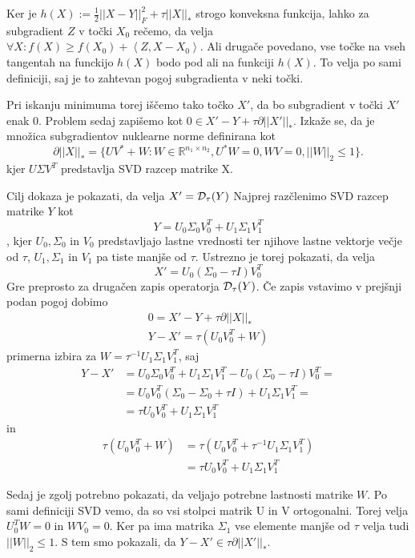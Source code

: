 Ker je $h(X) := \frac{1}{2} ||X - Y||^2_F + \tau||X||_*$ strogo konveksna funkcija, lahko za subgradient $Z$ v točki $X_0$ rečemo, da velja $\forall X: f(X) \geq  f(X_0) + \left< Z, X - X_0 \right>$. Ali drugače povedano, vse točke na vseh tangentah na funckijo $h(X)$ bodo pod ali na funkciji $h(X)$. To velja po sami definiciji, saj je to zahtevan pogoj subgradienta v neki točki.

Pri iskanju minimuma torej iščemo tako točko $X'$, da bo subgradient v točki $X'$ enak 0. Problem sedaj zapišemo kot $0 \in X' - Y + \tau \partial||X'||_*$. Izkaže se, da je množica subgradientov nuklearne norme definirana kot
\[
    \partial||X||_* = \{UV^* + W: W \in \mathbb{R}^{n_1 \times n_2}, U^*W = 0, WV = 0, ||W||_2 \leq 1 \}.
\]
kjer $U \Sigma V^T$ predstavlja SVD razcep matrike X. \cite{CCS}

Cilj dokaza je pokazati, da velja $X' = \mathcal{D}_\tau(Y)$ Najprej razčlenimo SVD razcep matrike $Y$ kot 
\[
    Y = U_0\Sigma_0V_0^T + U_1\Sigma_1V_1^T
\],
kjer $U_0, \Sigma_0$ in $V_0$ predstavljajo lastne vrednosti ter njihove lastne vektorje večje od $\tau$, $U_1, \Sigma_1$ in $V_1$ pa tiste manjše od $\tau$. Ustrezno je torej pokazati, da velja 
\[
    X' = U_0(\Sigma_0 - \tau I)V_0^T
\] Gre preprosto za drugačen zapis operatorja $\mathcal{D}_\tau(Y)$.
Če zapis vstavimo v prejšnji podan pogoj dobimo
\begin{align*}
    0 = X' - Y + \tau \partial ||X||_*\\
    Y- X' = \tau (U_0 V_0^T + W)
\end{align*}
primerna izbira za $W = \tau^{-1} U_1 \Sigma_1 V_1^T$, saj
\begin{align*}
    Y-X' &= U_0\Sigma_0V_0^T + U_1\Sigma_1V_1^T - U_0(\Sigma_0 - \tau I)V_0^T =\\ 
    &= U_0V_0^T(\Sigma_0 - \Sigma_0 + \tau I) + U_1\Sigma_1 V_1^T = \\
    &= \tau U_0 V_0^T + U_1\Sigma_1 V_1^T
\end{align*}
in 
\begin{align*}
    \tau(U_0 V_0^T + W) &= \tau(U_0V_0^T + \tau^{-1} U_1 \Sigma_1 V_1^T)\\ 
    &= \tau U_0 V_0^T + U_1 \Sigma_1 V_1^T 
\end{align*}

Sedaj je zgolj potrebno pokazati, da veljajo potrebne lastnosti matrike $W$.
Po sami definiciji SVD vemo, da so vsi stolpci matrik U in V ortogonalni. Torej velja $U_0^TW = 0$ in $WV_0 = 0$. Ker pa ima matrika $\Sigma_1$ vse elemente manjše od $\tau$ velja tudi $||W||_2 \leq 1$. S tem smo pokazali, da $Y - X' \in \tau \partial ||X'||_*$.

